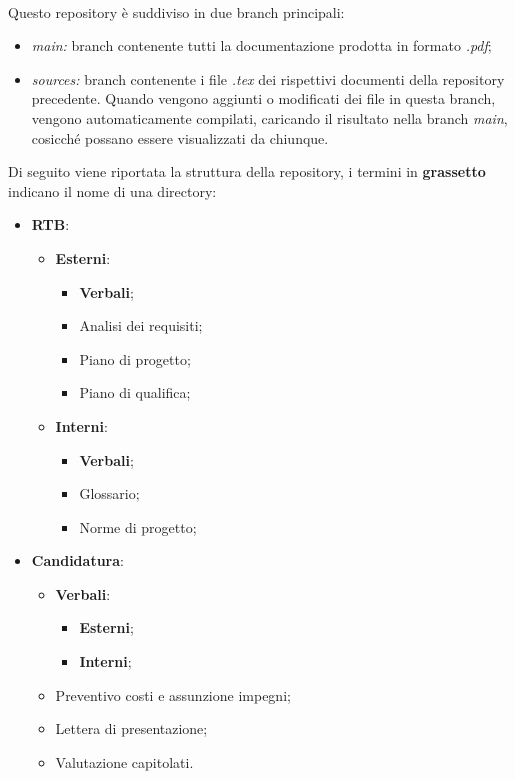  \\
Questo repository è suddiviso in due branch principali:
\begin{itemize}
    \item \textit{main:} branch contenente tutti la documentazione prodotta in formato \textit{.pdf};
    \item \textit{sources:} branch contenente i file \textit{.tex} dei rispettivi documenti della repository precedente. Quando vengono aggiunti o modificati dei file in questa branch, vengono automaticamente compilati, caricando il risultato nella branch \textit{main}, cosicché possano essere visualizzati da chiunque.
\end{itemize}
Di seguito viene riportata la struttura della repository, i termini in \textbf{grassetto} indicano il nome di una directory:
 \begin{itemize}
    \item \textbf{RTB}:
    \begin{itemize}
        \item \textbf{Esterni}:
        \begin{itemize}
            \item \textbf{Verbali};
            \item Analisi dei requisiti;
            \item Piano di progetto;
            \item Piano di qualifica;
        \end{itemize}
        \item \textbf{Interni}:
        \begin{itemize}
            \item \textbf{Verbali};
            \item Glossario;
            \item Norme di progetto;
        \end{itemize}
    \end{itemize}
    \item \textbf{Candidatura}:
    \begin{itemize}
        \item \textbf{Verbali}:
        \begin{itemize}
            \item \textbf{Esterni};
            \item \textbf{Interni};
        \end{itemize}
        \item Preventivo costi e assunzione impegni;
        \item Lettera di presentazione;
        \item Valutazione capitolati.
    \end{itemize}
 \end{itemize}

